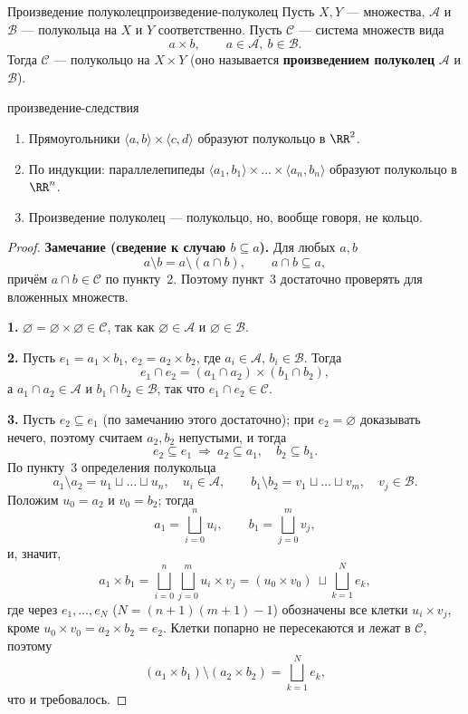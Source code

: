 \begin{Theorem}{Произведение полуколец}{произведение-полуколец}
	Пусть $X, Y$ --- множества, $\mathcal{A}$ и $\mathcal{B}$ --- полукольца
	на $X$ и $Y$ соответственно. Пусть $\mathcal{C}$ --- система множеств вида
	\[
	a \times b, \qquad a \in \mathcal{A},\ b \in \mathcal{B}.
	\]
	Тогда $\mathcal{C}$ --- полукольцо на $X \times Y$ (оно называется
	\textbf{произведением полуколец} $\mathcal{A}$ и $\mathcal{B}$).
\end{Theorem}

\begin{Corollary}{}{произведение-следствия}
	\begin{enumerate}
		\item Прямоугольники $\langle a,b\rangle \times \langle c,d\rangle$
		образуют полукольцо в $\RR^2$.
		\item По индукции: параллелепипеды
		$\langle a_1,b_1\rangle \times \ldots \times \langle a_n,b_n\rangle$
		образуют полукольцо в $\RR^n$.
		\item Произведение полуколец --- полукольцо, но, вообще говоря,
		не кольцо.
	\end{enumerate}
\end{Corollary}

\begin{proof}
	\textbf{Замечание (сведение к случаю $b \subseteq a$).} Для любых $a,b$
	\[
	a \setminus b = a \setminus (a \cap b), \qquad a \cap b \subseteq a,
	\]
	причём $a \cap b \in \mathcal{C}$ по пункту~2. Поэтому пункт~3
	достаточно проверять для вложенных множеств.

	\medskip
	\textbf{1.} $\varnothing = \varnothing \times \varnothing \in \mathcal{C}$,
	так как $\varnothing \in \mathcal{A}$ и $\varnothing \in \mathcal{B}$.

	\medskip
	\textbf{2.} Пусть $e_1 = a_1 \times b_1$, $e_2 = a_2 \times b_2$, где
	$a_i \in \mathcal{A}$, $b_i \in \mathcal{B}$. Тогда
	\[
	e_1 \cap e_2 = (a_1 \cap a_2) \times (b_1 \cap b_2),
	\]
	а $a_1 \cap a_2 \in \mathcal{A}$ и $b_1 \cap b_2 \in \mathcal{B}$, так что
	$e_1 \cap e_2 \in \mathcal{C}$.

	\medskip
	\textbf{3.} Пусть $e_2 \subseteq e_1$ (по замечанию этого достаточно); при
	$e_2 = \varnothing$ доказывать нечего, поэтому считаем $a_2, b_2$
	непустыми, и тогда
	\[
	e_2 \subseteq e_1 \ \Longrightarrow \ a_2 \subseteq a_1,\quad
	b_2 \subseteq b_1 .
	\]
	По пункту~3 определения полукольца
	\[
	a_1 \setminus a_2 = u_1 \sqcup \ldots \sqcup u_n, \quad u_i \in \mathcal{A},
	\qquad
	b_1 \setminus b_2 = v_1 \sqcup \ldots \sqcup v_m, \quad v_j \in \mathcal{B}.
	\]
	Положим $u_0 = a_2$ и $v_0 = b_2$; тогда
	\[
	a_1 = \bigsqcup_{i=0}^{n} u_i, \qquad
	b_1 = \bigsqcup_{j=0}^{m} v_j ,
	\]
	и, значит,
	\[
	a_1 \times b_1 = \bigsqcup_{i=0}^{n}\bigsqcup_{j=0}^{m} u_i \times v_j
	= (u_0 \times v_0) \ \sqcup \bigsqcup_{k=1}^{N} e_k ,
	\]
	где через $e_1,\ldots,e_N$ ($N = (n+1)(m+1) - 1$) обозначены все клетки
	$u_i \times v_j$, кроме $u_0 \times v_0 = a_2 \times b_2 = e_2$. Клетки
	попарно не пересекаются и лежат в $\mathcal{C}$, поэтому
	\[
	(a_1 \times b_1) \setminus (a_2 \times b_2) = \bigsqcup_{k=1}^{N} e_k ,
	\]
	что и требовалось.
\end{proof}

